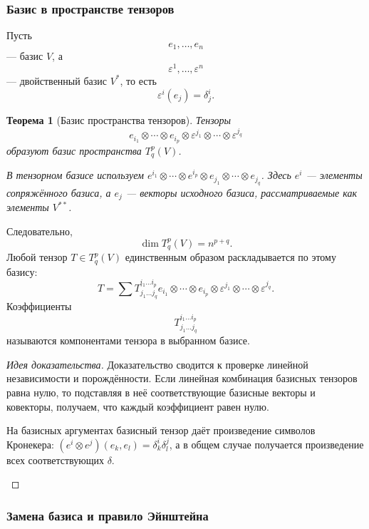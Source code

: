\documentclass[12pt,a4paper]{article}
\theoremstyle{definition}
\theoremstyle{plain}
\newtheorem{theorem}[definition]{Теорема}
\theoremstyle{remark}
\newenvironment{knowledgefix}{\begin{clarifybox}}{\end{clarifybox}}
\begin{document}
\subsubsection*{Базис в пространстве тензоров}

Пусть
\[
    e_1,\ldots,e_n
\]
--- базис $V$, а
\[
    \varepsilon^1,\ldots,\varepsilon^n
\]
--- двойственный базис $V^*$, то есть
\[
    \varepsilon^i(e_j)=\delta^i_j.
\]

\begin{theorem}[Базис пространства тензоров]
Тензоры
\[
    e_{i_1}\otimes\cdots\otimes e_{i_p}
    \otimes
    \varepsilon^{j_1}\otimes\cdots\otimes\varepsilon^{j_q}
\]
образуют базис пространства $T^p_q(V)$.
\begin{knowledgefix}
В тензорном базисе используем \(e^{i_1}\otimes\cdots\otimes e^{i_p}\otimes e_{j_1}\otimes\cdots\otimes e_{j_q}\). Здесь \(e^i\) — элементы сопряжённого базиса, а \(e_j\) — векторы исходного базиса, рассматриваемые как элементы \(V^{**}\).
\end{knowledgefix}
\end{theorem}

Следовательно,
\[
    \dim T^p_q(V)=n^{p+q}.
\]
Любой тензор $T\in T^p_q(V)$ единственным образом раскладывается по этому базису:
\[
    T=
    \sum
    T^{i_1\ldots i_p}_{j_1\ldots j_q}
    e_{i_1}\otimes\cdots\otimes e_{i_p}
    \otimes
    \varepsilon^{j_1}\otimes\cdots\otimes\varepsilon^{j_q}.
\]
Коэффициенты
\[
    T^{i_1\ldots i_p}_{j_1\ldots j_q}
\]
называются компонентами тензора в выбранном базисе.

\begin{proof}[Идея доказательства]
Доказательство сводится к проверке линейной независимости и порождённости. Если линейная комбинация базисных тензоров равна нулю, то подставляя в неё соответствующие базисные векторы и ковекторы, получаем, что каждый коэффициент равен нулю.
\begin{knowledgefix}
На базисных аргументах базисный тензор даёт произведение символов Кронекера: \((e^{i}\otimes e^{j})(e_k,e_l)=\delta^i_k\delta^j_l\), а в общем случае получается произведение всех соответствующих \(\delta\).
\end{knowledgefix}
\end{proof}

\subsubsection*{Замена базиса и правило Эйнштейна}
\end{document}
